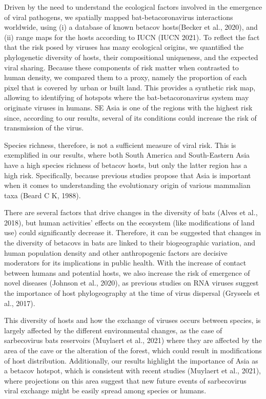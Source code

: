 \documentclass[11pt]{article}
\begin{document}
Driven by the need to understand the ecological factors involved in the
emergence of viral pathogens, we spatially mapped bat-betacoronavirus
interactions worldwide, using (i) a database of known betacov
hosts(Becker et al., 2020), and (ii) range maps for the hosts according
to IUCN (IUCN 2021). To reflect the fact that the risk posed by viruses
has many ecological origins, we quantified the phylogenetic diversity of
hosts, their compositional uniqueness, and the expected viral sharing.
Because these components of risk matter when contrasted to human
density, we compared them to a proxy, namely the proportion of each
pixel that is covered by urban or built land. This provides a synthetic
risk map, allowing to identifying of hotspots where the
bat-betacoronavirus system may originate viruses in humans. SE Asia is
one of the regions with the highest risk since, according to our
results, several of its conditions could increase the risk of
transmission of the virus.

Species richness, therefore, is not a sufficient measure of viral risk.
This is exemplified in our results, where both South America and
South-Eastern Asia have a high species richness of betacov hosts, but
only the latter region has a high risk. Specifically, because previous
studies propose that Asia is important when it comes to understanding
the evolutionary origin of various mammalian taxa (Beard C K, 1988).

There are several factors that drive changes in the diversity of bats
(Alves et al., 2018), but human activities' effects on the ecosystem
(like modifications of land use) could significantly decrease it.
Therefore, it can be suggested that changes in the diversity of betacovs
in bats are linked to their biogeographic variation, and human
population density and other anthropogenic factors are decisive
moderators for its implications in public health. With the increase of
contact between humans and potential hosts, we also increase the risk of
emergence of novel diseases (Johnson et al., 2020), as previous studies
on RNA viruses suggest the importance of host phylogeography at the time
of virus dispersal (Gryseels et al., 2017).

This diversity of hosts and how the exchange of viruses occurs between
species, is largely affected by the different environmental changes, as
the case of sarbecovirus bats reservoirs (Muylaert et al., 2021) where
they are affected by the area of the cave or the alteration of the
forest, which could result in modifications of host distribution.
Additionally, our results highlight the importance of Asia as a betacov
hotspot, which is consistent with recent studies (Muylaert et al.,
2021), where projections on this area suggest that new future events of
sarbecovirus viral exchange might be easily spread among species or
humans.
\end{document}
